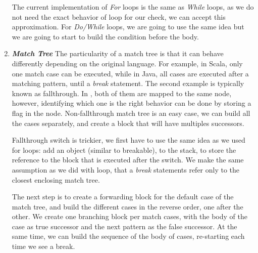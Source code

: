 \begin{enumerate}
	The current implementation of \emph{For} loops is the same as \emph{While} loops, as we do not need the exact behavior of loop for our check, we can accept this approximation.
	For \emph{Do/While} loops, we are going to use the same idea but we are going to start to build the condition before the body.
	
	\item \textbf{\textit{Match Tree}} \newline 
	\label{subsubsec:match_tree_cfg}
	The particularity of a match tree is that it can behave differently depending on the original language.
	For example, in Scala, only one match case can be executed, while in Java, all cases are executed after a matching pattern, until a \emph{break} statement.
	The second example is typically known as fallthrough. 
	In \slang{}, both of them are mapped to the same node, however, identifying which one is the right behavior can be done by storing a flag in the node.
	Non-fallthrough match tree is an easy case, we can build all the cases separately, and create a block that will have multiples successors.
	
	Fallthrough switch is trickier, we first have to use the same idea as we used for loops: add an object (similar to breakable), to the stack, to store the reference to the block that is executed after the switch. 
	We make the same assumption as we did with loop, that a \emph{break} statements refer only to the closest enclosing match tree. 
	
	The next step is to create a forwarding block for the default case of the match tree, and build the different cases in the reverse order, one after the other. 
	We create one branching block per match cases, with the body of the case as true successor and the next pattern as the false successor. 
	At the same time, we can build the sequence of the body of cases, re-starting each time we see a break.
	
	
	

\end{enumerate}
